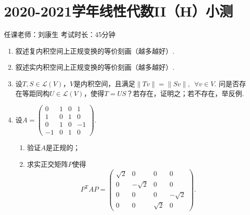 \section{2020-2021学年线性代数II（H）小测}

\begin{center}
    任课老师：刘康生\hspace{4em} 考试时长：45分钟
\end{center}

\begin{enumerate}
    \item 叙述复内积空间上正规变换的等价刻画（越多越好）.
	\item 叙述实内积空间上正规变换的等价刻画（越多越好）.
	\item 设$T,S\in\mathcal{L}(V)$，$V$是内积空间，且满足$\lVert Tv \rVert=\lVert Sv \rVert,\enspace \forall v\in V$. 问是否存在等距同构$U\in\mathcal{L}(V)$，使得$T=US$？若存在，证明之；若不存在，举反例.
	\item 设$A=\begin{pmatrix}
        0 & 1 & 0 & 1 \\ 1 & 0 & 1 & 0 \\ 0 & 1 & 0 & -1 \\ -1 & 0 & 1 & 0
    \end{pmatrix}$.
    \begin{enumerate}
        \item 验证$A$是正规的；

        \item 求实正交矩阵$P$使得
        \[P^{\mathrm{T}}AP=\begin{pmatrix}
            \sqrt{2} & 0 & 0 & 0 \\ 0 & -\sqrt{2} & 0 & 0 \\ 0 & 0 & 0 & -\sqrt{2} \\ 0 & 0 & \sqrt{2} & 0
        \end{pmatrix}.\]
    \end{enumerate}
\end{enumerate}

\clearpage

